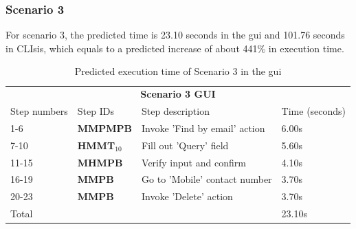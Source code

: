 \subsubsection{Scenario 3}
For scenario 3, the predicted time is 23.10 seconds in the \acrshort{gui} and 101.76 seconds in CLIsis, which equals to a predicted increase of about 441\% in execution time.

\begin{table}[H]
	\center
	
	\begin{tabular}{llll}
		\toprule
		\multicolumn{4}{c}{\textbf{Scenario 3 GUI}} \\
		\addlinespace[0.5em]
		Step numbers & Step IDs & Step description & Time (seconds) \\
		\midrule
		1-6 		& \textbf{MMPMPB} 				& Invoke 'Find by email' action 	& 6.00s \\
		7-10		& \textbf{HMMT$_{10}$} 		& Fill out 'Query' field		 			& 5.60s \\
		11-15	& \textbf{MHMPB}					& Verify input and confirm			& 4.10s \\
		16-19	& \textbf{MMPB}						& Go to 'Mobile' contact number	& 3.70s \\
		20-23	& \textbf{MMPB}						& Invoke 'Delete' action				& 3.70s \\
		\midrule
		\multicolumn{3}{l}{Total}																		& 23.10s\\
		\bottomrule
	\end{tabular}

	\caption{Predicted execution time of Scenario 3 in the \acrshort{gui}}
	\label{table:gomsscenario3gui}
\end{table}

